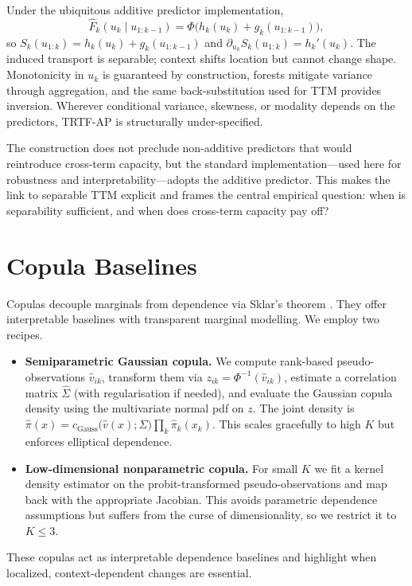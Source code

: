 \documentclass[11pt,a4paper,twoside]{book}\usepackage[]{graphicx}\usepackage[]{xcolor}
\begin{document}
Under the ubiquitous additive predictor implementation,
\begin{equation}
  \widehat{F}_k(u_k\mid u_{1:k-1}) = \Phi\big(h_k(u_k) + g_k(u_{1:k-1})\big),
  \label{eq:methods-trtf-additive}
\end{equation}
so $S_k(u_{1:k}) = h_k(u_k) + g_k(u_{1:k-1})$ and $\partial_{u_k}S_k(u_{1:k}) = h_k'(u_k)$. The induced transport is separable; context shifts location but cannot change shape. Monotonicity in $u_k$ is guaranteed by construction, forests mitigate variance through aggregation, and the same back-substitution used for TTM provides inversion. Wherever conditional variance, skewness, or modality depends on the predictors, TRTF-AP is structurally under-specified.

The construction does not preclude non-additive predictors that would reintroduce cross-term capacity, but the standard implementation---used here for robustness and interpretability---adopts the additive predictor. This makes the link to separable TTM explicit and frames the central empirical question: when is separability sufficient, and when does cross-term capacity pay off?

\section{Copula Baselines}

Copulas decouple marginals from dependence via Sklar's theorem \citep{sklar1959fonctions}. They offer interpretable baselines with transparent marginal modelling. We employ two recipes.
\begin{itemize}
  \item \textbf{Semiparametric Gaussian copula.} We compute rank-based pseudo-observations $\hat{v}_{ik}$, transform them via $z_{ik}=\Phi^{-1}(\hat{v}_{ik})$, estimate a correlation matrix $\widehat{\Sigma}$ (with regularisation if needed), and evaluate the Gaussian copula density using the multivariate normal pdf on $z$. The joint density is $\hat{\pi}(x)=c_{\mathrm{Gauss}}\!\big(\hat{v}(x);\widehat{\Sigma}\big)\prod_k \hat{\pi}_k(x_k)$. This scales gracefully to high $K$ but enforces elliptical dependence.
  \item \textbf{Low-dimensional nonparametric copula.} For small $K$ we fit a kernel density estimator on the probit-transformed pseudo-observations and map back with the appropriate Jacobian. This avoids parametric dependence assumptions but suffers from the curse of dimensionality, so we restrict it to $K\le 3$.
\end{itemize}
These copulas act as interpretable dependence baselines and highlight when localized, context-dependent changes are essential.
\end{document}
